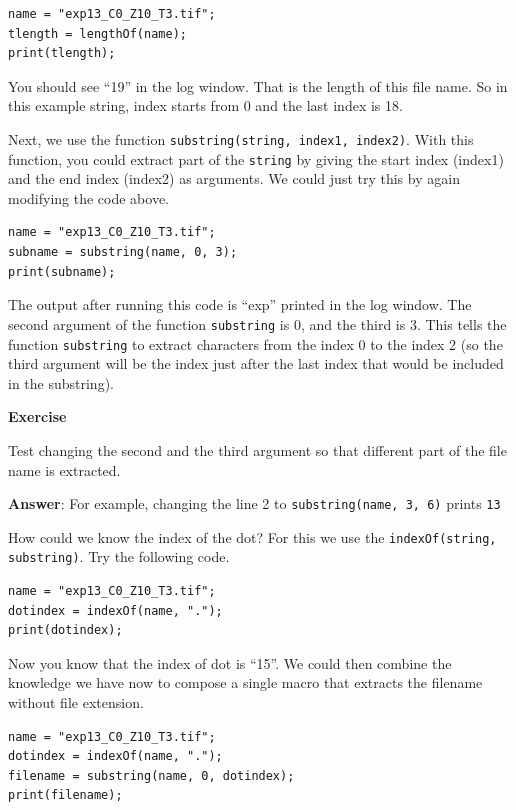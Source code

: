 \documentclass[11pt,a4paper,oneside]{report}
\newenvironment{indentexercise}[1]
{{\setlength{\leftmargin}{2em}}
\textbf{Exercise \thesubsection-#1}
\begin{list}{}
	\item
}
{\end{list}}
\newcommand{\ilcom}[1]{\texttt{\small#1}}
\begin{document}
\begin{lstlisting}
name = "exp13_C0_Z10_T3.tif";
tlength = lengthOf(name);
print(tlength);
\end{lstlisting}

You should see ``19'' in the log window. That is the length of this file name. So in this example string, index starts from 0 and the last index is 18. 

Next, we use the function \ilcom{substring(string, index1, index2)}. With this function, you could extract part of the \ilcom{string} by giving the start index (index1) and the end index (index2) as arguments. We could just try this by again modifying the code above. 

\begin{lstlisting}
name = "exp13_C0_Z10_T3.tif";
subname = substring(name, 0, 3);
print(subname);
\end{lstlisting}

The output after running this code is ``exp'' printed in the log window. The second argument of the function \ilcom{substring} is 0, and the third is 3. This tells the function \ilcom{substring} to extract characters from the index 0 to the index 2 (so the third argument will be the index just after the last index that would be included in the substring). 

\begin{indentexercise}{1}
	\item Test changing the second and the third argument so that different part of the file name is extracted.
	\item \textbf{Answer}: For example, changing the line 2 to \ilcom{substring(name, 3, 6)} prints \ilcom{13\textunderscore}
\end{indentexercise}

How could we know the index of the dot? For this we use the \ilcom{indexOf(string, substring)}. Try the following code. 

\begin{lstlisting}
name = "exp13_C0_Z10_T3.tif";
dotindex = indexOf(name, ".");
print(dotindex);
\end{lstlisting}

Now you know that the index of dot is ``15''. We could then combine the knowledge we have now to compose a single macro that extracts the filename without file extension. 

\begin{lstlisting}
name = "exp13_C0_Z10_T3.tif";
dotindex = indexOf(name, ".");
filename = substring(name, 0, dotindex);
print(filename);
\end{lstlisting}
\end{document}
